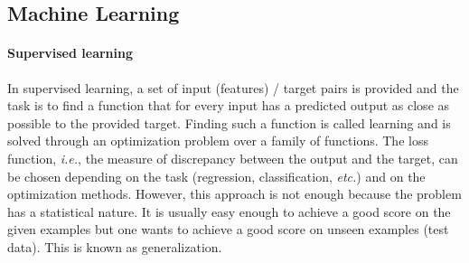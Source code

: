 \documentclass[11pt]{article}
\begin{document}
	\subsection{Machine Learning}
		\label{sec:maching_learning}
		\paragraph{Supervised learning}
		In supervised learning, a set of input (features) / target pairs is provided and the task is to
		find a function that for every input has a predicted output as close as possible to the provided
		target.
		Finding such a function is called learning and is solved through an optimization problem over a
		family of functions.
		The loss function, \textit{i.e.}, the measure of discrepancy between the output and the target, can
		be chosen depending on the task (regression, classification, \textit{etc.}) and on the optimization
		methods.
		However, this approach is not enough because the problem has a statistical nature.
		It is usually easy enough to achieve a good score on the given examples but one wants to achieve a
		good score on unseen examples (test data).
		This is known as generalization.
\end{document}
